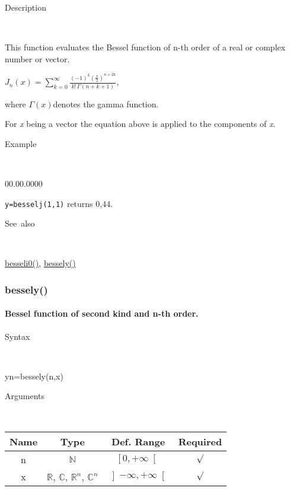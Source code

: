 \begin{description}
\item [Description]~
\end{description}
This function evaluates the Bessel function of n-th order of a real
or complex number or vector.

\medskip{}
$J_{n}\left(x\right)={\displaystyle \sum\limits _{k=0}^{\infty}\frac{\left(-1\right)^{k}\left(\frac{x}{2}\right)^{n+2k}}{k!\,\Gamma\left(n+k+1\right)}}$,
\medskip{}

where $\Gamma\left(x\right)$denotes the gamma function.
\medskip{}

For \textit{x} being a vector the equation above is applied
to the components of \textit{x}.

\begin{description}
\item [Example]~
\end{description}
\begin{lyxlist}{00.00.0000}
\item [\texttt{y=besselj(1,1)}]returns 0,44.
\end{lyxlist}
\begin{description}
\item [See~also]~
\end{description}
\textcolor{blue}{\hyperlink{besseli0}{besseli0()}}\textcolor{black}{,}
\textcolor{blue}{\hyperlink{bessely}{bessely()}}


\newpage
\subsubsection*{\hypertarget{bessely}{}{\Large bessely()}}


\paragraph{\label{par:Bessel2-function}Bessel function of second kind and n-th
order.}

\begin{description}
\item [Syntax]~
\end{description}
yn=bessely(n,x)

\begin{description}
\item [Arguments]~
\end{description}
\begin{tabular}{|c|c|c|c|}
\hline 
Name&
Type&
Def. Range&
Required\tabularnewline
\hline
\hline 
n&
$\mathbb{N}$&
$\left[0,+\infty\right[$&
$\surd$\tabularnewline
\hline
x&
$\mathbb{R}$, $\mathbb{C}$, $\mathbb{R}^{n}$, $\mathbb{C}^{n}$&
$\left]-\infty,+\infty\right[$&
$\surd$\tabularnewline
\hline
\end{tabular}

